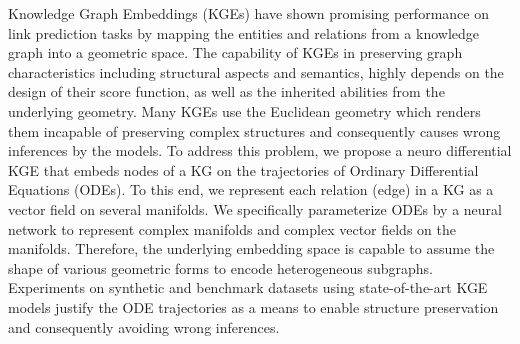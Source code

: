 Knowledge Graph Embeddings (KGEs) have shown promising performance on link prediction tasks by mapping the entities and relations from a knowledge graph into a geometric space. The capability of KGEs in preserving graph characteristics including structural aspects and semantics, highly depends on the design of their score function, as well as the inherited abilities from the underlying geometry. Many KGEs use the Euclidean geometry which renders them incapable of preserving complex structures and consequently causes wrong inferences by the models. To address this problem, we propose a neuro differential KGE that embeds nodes of a KG on the trajectories of Ordinary Differential Equations (ODEs). To this end, we represent each relation (edge) in a KG as a vector field on several manifolds. We specifically parameterize ODEs by a neural network to represent complex manifolds and complex vector fields on the manifolds. Therefore, the underlying embedding space is capable to assume the shape of various geometric forms to encode heterogeneous subgraphs. Experiments on synthetic and benchmark datasets using state-of-the-art KGE models justify the ODE trajectories as a means to enable structure preservation and consequently avoiding wrong inferences.
